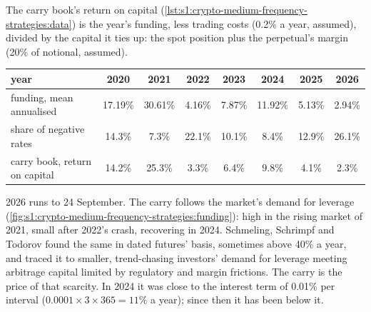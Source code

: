 The carry book's return on capital (\cref{lst:s1:crypto-medium-frequency-strategies:data}) is the year's funding, less trading costs (0.2\% a year,
assumed), divided by the capital it ties up: the spot position plus the perpetual's margin (20\% of notional, assumed).

\begin{center}
\small
\begin{tabular}{@{}lccccccc@{}}
\toprule
year & 2020 & 2021 & 2022 & 2023 & 2024 & 2025 & 2026\\
\midrule
funding, mean annualised & 17.19\% & 30.61\% & 4.16\% & 7.87\% & 11.92\% & 5.13\% & 2.94\%\\
share of negative rates & 14.3\% & 7.3\% & 22.1\% & 10.1\% & 8.4\% & 12.9\% & 26.1\%\\
carry book, return on capital & 14.2\% & 25.3\% & 3.3\% & 6.4\% & 9.8\% & 4.1\% & 2.3\%\\
\bottomrule
\end{tabular}
\end{center}

2026 runs to 24 September. The carry follows the market's demand for leverage (\cref{fig:s1:crypto-medium-frequency-strategies:funding}): high in the
rising market of 2021, small after 2022's crash, recovering in 2024. Schmeling, Schrimpf and Todorov found the same in dated futures' basis, sometimes
above 40\% a year, and traced it to smaller, trend-chasing investors' demand for leverage meeting arbitrage capital limited by regulatory and margin
frictions. The carry is the price of that scarcity. In 2024 it was close to the interest term of 0.01\% per interval ($0.0001 \times 3 \times 365 = 11\%$ a
year); since then it has been below it.

\begin{omfigure}

\label{fig:s1:crypto-medium-frequency-strategies:funding}
\end{omfigure}

